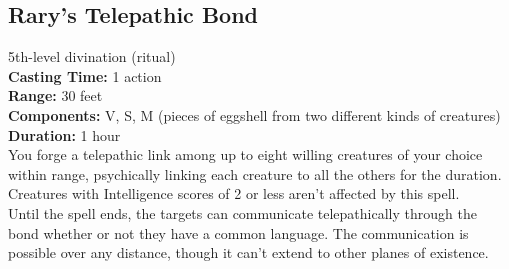 \documentclass[11pt, A4paper, english]{article}
\begin{document}
		\subsection{Rary’s Telepathic Bond}
5th-level divination (ritual) \\
\textbf{Casting Time:} 1 action \\
\textbf{Range:} 30 feet \\
\textbf{Components:} V, S, M (pieces of eggshell from two different kinds of creatures) \\
\textbf{Duration:} 1 hour \\
You forge a telepathic link among up to eight willing creatures of your choice within range, psychically linking each creature to all the others for the duration. Creatures with Intelligence scores of 2 or less aren’t affected by this spell. \\
Until the spell ends, the targets can communicate telepathically through the bond whether or not they have a common language. The communication is possible over any distance, though it can’t extend to other planes of existence.
\end{document}
